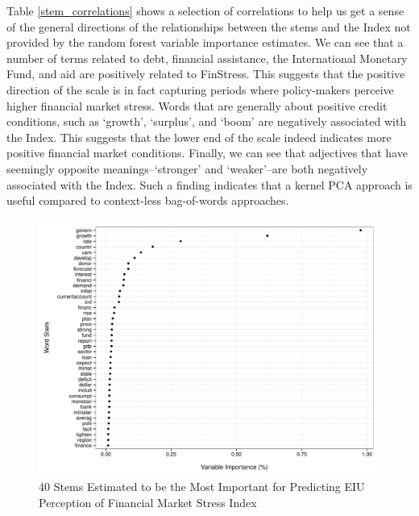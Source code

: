 \documentclass[]{article}
\begin{document}
Table \ref{stem_correlations} shows a selection of correlations to help us get a sense of the general directions of the relationships between the stems and the Index not provided by the random forest variable importance estimates. We can see that a number of terms related to debt, financial assistance, the International Monetary Fund, and aid are positively related to FinStress. This suggests that the positive direction of the scale is in fact capturing periods where policy-makers perceive higher financial market stress. Words that are generally about positive credit conditions, such as `growth', `surplus', and `boom' are negatively associated with the Index. This suggests that the lower end of the scale indeed indicates more positive financial market conditions. Finally, we can see that adjectives that have seemingly opposite meanings--`stronger' and `weaker'--are both negatively associated with the Index. Such a finding indicates that a kernel PCA approach is useful compared to context-less bag-of-words approaches.

\begin{figure}
    \caption{40 Stems Estimated to be the Most Important for Predicting EIU Perception of Financial Market Stress Index}
    \label{rf_importance}

    \begin{center}
        \includegraphics[scale=0.5]{figures/rf_stem_importance.pdf}
    \end{center}

\end{figure}


\end{document}
